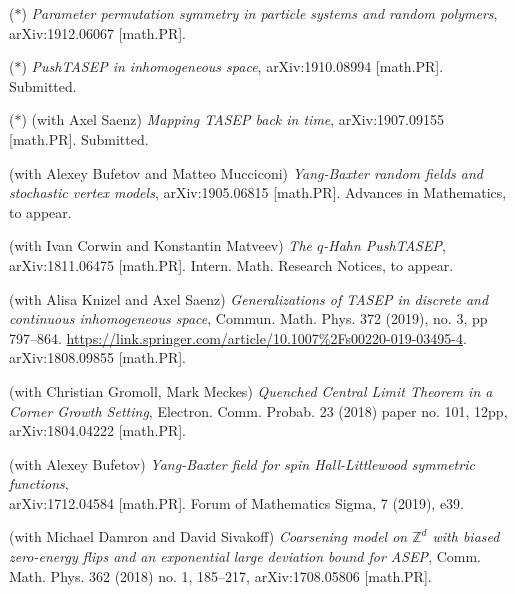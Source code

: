 \documentclass[letterpaper,11pt]{article}
\begin{document}
\begin{etaremune}
	\renewcommand{\labelenumi}{[\theenumi]}
	\item ($*$)
		\emph{Parameter permutation symmetry in particle systems and random polymers},
		arXiv:1912.06067 [math.PR].
	\item ($*$)
		\emph{PushTASEP in inhomogeneous space},
		arXiv:1910.08994 [math.PR]. Submitted.
	\item ($*$)
		(with Axel Saenz)
		\emph{Mapping TASEP back in time},
		arXiv:1907.09155 [math.PR]. Submitted.
\item 
	(with Alexey Bufetov and Matteo Mucciconi)
	\emph{Yang-Baxter random fields and stochastic vertex models},
	arXiv:1905.06815 [math.PR]. Advances in Mathematics, to appear.
\item 
	(with Ivan Corwin and Konstantin Matveev)
	\emph{The $q$-Hahn PushTASEP},
	arXiv:1811.06475 [math.PR]. Intern. Math. Research Notices, to appear.
\item 
	(with Alisa Knizel and
		Axel Saenz)
		\emph{Generalizations of TASEP in discrete and continuous inhomogeneous space},
		Commun. Math. Phys. 
		372 (2019), no. 3, pp 797–864.
		\url{https://link.springer.com/article/10.1007%2Fs00220-019-03495-4}.
		arXiv:1808.09855 [math.PR].
\item (with Christian Gromoll, Mark Meckes)
		\emph{Quenched Central Limit Theorem in a Corner Growth Setting},
		Electron. Comm. Probab. 23 (2018) paper no. 101, 12pp,
		arXiv:1804.04222 [math.PR].
	
	\item (with Alexey Bufetov)
		\emph{Yang-Baxter field for spin Hall-Littlewood symmetric functions},\\
		arXiv:1712.04584 [math.PR]. Forum of Mathematics Sigma, 7 (2019), e39.
	\item
	      (with Michael Damron and David Sivakoff) \emph{Coarsening model
		      on $\mathbb{Z}^d$ with biased zero-energy flips and an exponential large
			deviation bound for ASEP}, 
			Comm. Math. Phys. 362 (2018) no. 1, 185–217,
			arXiv:1708.05806 [math.PR].
					

\end{etaremune}
\end{document}
